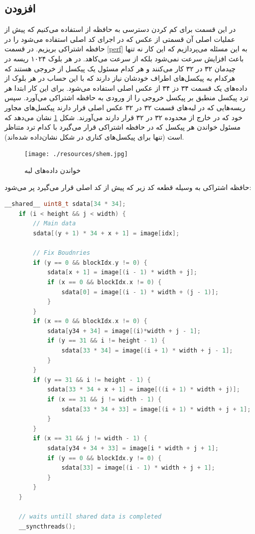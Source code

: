\documentclass{article}
\begin{document}
\subsection{افزودن }
در این قسمت برای کم کردن دسترسی به حافظه از  استفاده می‌کنیم که پیش از عملیات اصلی آن قسمتی از عکس که در اجرای کد اصلی استفاده می‌شود را در حافظه اشتراکی بریزیم. در قسمت \ref{perf}
به این مسئله می‌پردازیم که این کار نه تنها باعث افزایش سرعت نمی‌شود بلکه از سرعت می‌کاهد.
در هر بلوک ۱۰۲۴ ریسه در چیدمان ۳۲ در ۳۲ کار می‌کنند و هر کدام مسئول یک پیکسل از
خروجی هستند که هرکدام به پیکسل‌های اطراف خودشان نیاز دارند که با این حساب در هر
بلوک از داده‌های یک قسمت ۳۴ دز ۳۴ از عکس اصلی استفاده می‌شود. برای این کار ابتدا هر ترد
پیکسل منطبق بر پیکسل خروجی را از ورودی به حافظه اشتراکی می‌آورد. سپس ریسه‌هایی که در لبه‌های
قسمت ۳۲ در ۳۲ عکس اصلی قرار دارند پیکسل‌های مجاور خود که در خارج از محدوده ۳۲ در ۳۲ قرار دارند می‌آورند. شکل \ref{fig:shem} نشان می‌دهد که مسئول خواندن هر پیکسل که در حافظه اشتراکی قرار می‌گیرد
با کدام ترد متناظر است (تنها برای پیکسل‌های کناری در شکل نشان‌داده شده‌اند).

\begin{figure}
	\centering
	\texttt{[image: ./resources/shem.jpg]}
	\caption{خواندن داده‌های لبه}
	\label{fig:shem}
\end{figure}

حافظه اشتراکی به وسیله قطعه کد زیر که پیش از کد اصلی قرار می‌گیرد پر می‌شود:

\begin{latin}
\begin{lstlisting}[language=C++]
    __shared__ uint8_t sdata[34 * 34];
    if (i < height && j < width) {
        // Main data
        sdata[(y + 1) * 34 + x + 1] = image[idx];

        // Fix Boudnries
        if (y == 0 && blockIdx.y != 0) {
            sdata[x + 1] = image[(i - 1) * width + j];
            if (x == 0 && blockIdx.x != 0) {
                sdata[0] = image[(i - 1) * width + (j - 1)];
            }
        }
        if (x == 0 && blockIdx.x != 0) {
            sdata[y34 + 34] = image[(i)*width + j - 1];
            if (y == 31 && i != height - 1) {
                sdata[33 * 34] = image[(i + 1) * width + j - 1];
            }
        }
        if (y == 31 && i != height - 1) {
            sdata[33 * 34 + x + 1] = image[((i + 1) * width + j)];
            if (x == 31 && j != width - 1) {
                sdata[33 * 34 + 33] = image[(i + 1) * width + j + 1];
            }
        }
        if (x == 31 && j != width - 1) {
            sdata[y34 + 34 + 33] = image[i * width + j + 1];
            if (y == 0 && blockIdx.y != 0) {
                sdata[33] = image[(i - 1) * width + j + 1];
            }
        }
    }

    // waits untill shared data is completed
    __syncthreads();
\end{lstlisting}
\end{latin}
\end{document}
